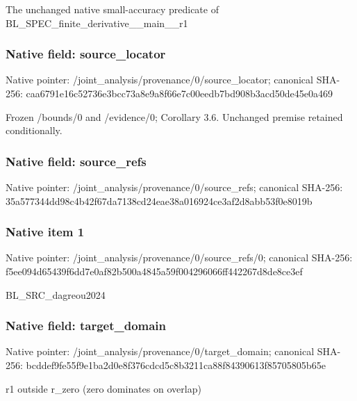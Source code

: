 \documentclass[10pt,a4paper]{article}
\begin{document}
\begingroup\raggedright\sloppy The unchanged native small-accuracy predicate of BL\_\allowbreak{}SPEC\_\allowbreak{}finite\_\allowbreak{}derivative\_\allowbreak{}\_\allowbreak{}main\_\allowbreak{}\_\allowbreak{}r1\par\endgroup

\subsubsection{Native field: source\_\allowbreak{}locator}
Native pointer: /joint\_\allowbreak{}analysis/provenance/0/source\_\allowbreak{}locator; canonical SHA-256: caa6791e16c52736e3bcc73a8e9a8f66e7c00eedb7bd908b3acd50de45e0a469

\begingroup\raggedright\sloppy Frozen /\allowbreak{}bounds/\allowbreak{}0 and /\allowbreak{}evidence/\allowbreak{}0;\allowbreak{} Corollary 3.6. Unchanged premise retained conditionally.\par\endgroup

\subsubsection{Native field: source\_\allowbreak{}refs}
Native pointer: /joint\_\allowbreak{}analysis/provenance/0/source\_\allowbreak{}refs; canonical SHA-256: 35a577344dd98c4b42f67da7138cd24eae38a016924ce3af2d8abb53f0e8019b

\subsubsection{Native item 1}
Native pointer: /joint\_\allowbreak{}analysis/provenance/0/source\_\allowbreak{}refs/0; canonical SHA-256: f5ee094d65439f6dd7e0af82b500a4845a59f004296066ff442267d8de8ce3ef

\begingroup\raggedright\sloppy BL\_\allowbreak{}SRC\_\allowbreak{}dagreou2024\par\endgroup

\subsubsection{Native field: target\_\allowbreak{}domain}
Native pointer: /joint\_\allowbreak{}analysis/provenance/0/target\_\allowbreak{}domain; canonical SHA-256: bcddef9fe55f9e1ba2d0e8f376cdcd5c8b3211ca88f84390613f85705805b65e

\begingroup\raggedright\sloppy r1 outside r\_\allowbreak{}zero (zero dominates on overlap)\par\endgroup
\end{document}
